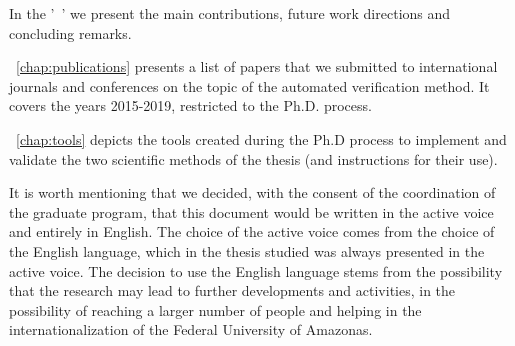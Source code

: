 In the '~' we present the main contributions, future work directions and concluding remarks.

~\autoref{chap:publications} presents a list of papers that we submitted to international journals and conferences on the topic of the automated verification method. It covers the years 2015-2019, restricted to the Ph.D. process.

~\autoref{chap:tools} depicts the tools created during the Ph.D process to implement and validate the two scientific methods of the thesis (and instructions for their use).

It is worth mentioning that we decided, with the consent of the coordination of the graduate program, that this document would be written in the active voice and entirely in English. The choice of the active voice comes from the choice of the English language, which in the thesis studied was always presented in the active voice. The decision to use the English language stems from the possibility that the research may lead to further developments and activities,  in the possibility of reaching a larger number of people and helping in the internationalization of the Federal University of Amazonas.